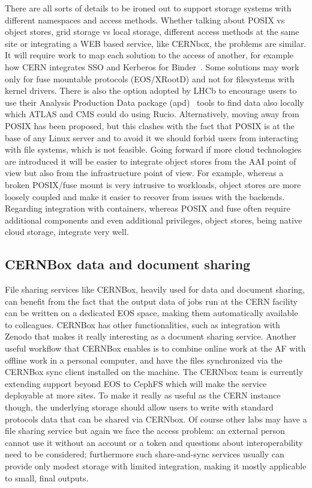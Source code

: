 There are all sorts of details to be ironed out to support storage systems with different namespaces and access methods. Whether talking about POSIX vs object stores, grid storage vs local storage, different access methods at the same site or integrating a WEB based service, like CERNbox, the problems are similar. It will require work to map each solution to the access of another, for example how CERN integrates SSO and Kerberos for Binder~\cite{binder}. Some solutions may work only for fuse mountable protocols (EOS/XRootD) and not for filesystems with kernel drivers. There is also the option adopted by LHCb to encourage users to use their Analysis Production Data package (apd)~\cite{apd} tools to find data also locally which ATLAS and CMS could do using Rucio.   Alternatively, moving away from POSIX has been proposed, but this clashes with the fact that POSIX is at the base of any Linux server and to avoid it we should forbid users from interacting with file systems, which is not feasible. Going forward if more cloud technologies are introduced it will be easier to integrate object stores from the AAI point of view but also from the infrastructure point of view. For example, whereas a broken POSIX/fuse mount is very intrusive to workloads, object stores are more loosely coupled and make it easier to recover from issues with the backends. Regarding integration with containers, whereas POSIX and fuse often require additional components and even additional privileges, object stores, being native cloud storage, integrate very well. 

\subsection*{CERNBox data and document sharing}

File sharing services like CERNBox, heavily used for data and document sharing, can benefit from the fact that the output data of jobs run at the CERN facility can be written on a dedicated EOS space, making them automatically available to colleagues. CERNBox has other functionalities, such as integration with Zenodo that makes it really interesting as a document sharing service. Another useful workflow that CERNBox enables is to combine online work at the AF with offline work in a personal computer, and have the files synchronized via the CERNBox sync client installed on the machine. The CERNbox team is currently extending support beyond EOS to CephFS which will make the service deployable at more sites. To make it really as useful as the CERN instance though, the underlying storage should allow users to write with standard protocols data that can be shared via CERNbox. Of course other labs may have a file sharing service but again we face the access problem: an external person cannot use it without an account or a token and questions about interoperability need to be considered; furthermore such share-and-sync services usually can provide only modest storage with limited integration, making it mostly applicable to small, final outputs.

